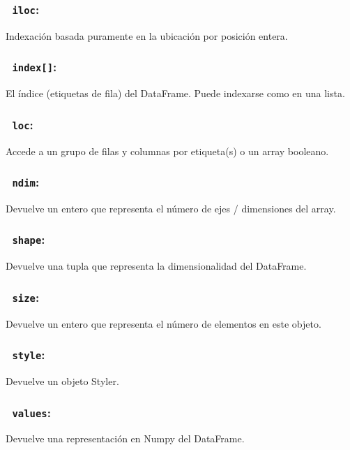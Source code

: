         \subsubsection{~\hspace{2em}\texttt{iloc}:} Indexación basada puramente en la ubicación por posición entera.

        \subsubsection{~\hspace{2em}\texttt{index[]}:} El índice (etiquetas de fila) del DataFrame. Puede indexarse como en una lista.

        \subsubsection{~\hspace{2em}\texttt{loc}:} Accede a un grupo de filas y columnas por etiqueta(s) o un array booleano.

        \subsubsection{~\hspace{2em}\texttt{ndim}:} Devuelve un entero que representa el número de ejes / dimensiones del array.

        \subsubsection{~\hspace{2em}\texttt{shape}:} Devuelve una tupla que representa la dimensionalidad del DataFrame.

        \subsubsection{~\hspace{2em}\texttt{size}:} Devuelve un entero que representa el número de elementos en este objeto.

        \subsubsection{~\hspace{2em}\texttt{style}:} Devuelve un objeto Styler.

        \subsubsection{~\hspace{2em}\texttt{values}:} Devuelve una representación en Numpy del DataFrame.



